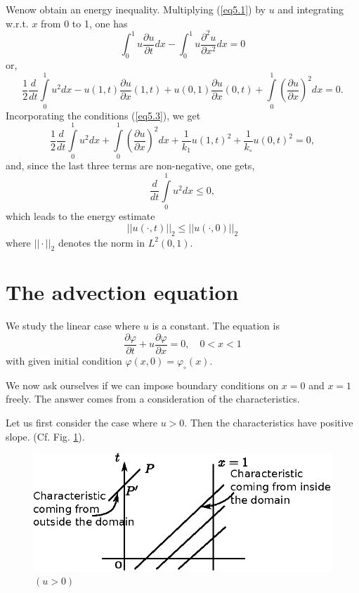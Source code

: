 We\pageoriginale now obtain an energy inequality. Multiplying (\ref{eq5.1}) by
$u$ and integrating w.r.t. $x$ from 0 to 1, one has 
$$
\int^1_0 u \frac{\partial u}{\partial t} dx - \int^1_0 u
\frac{\partial^2 u}{\partial x^2} dx = 0
$$
or, 
$$
\frac{1}{2} \frac{d}{dt} \int\limits^1_0 u^2 dx - u (1,t)
\frac{\partial u}{\partial x} (1,t) + u(0,1) \frac{\partial
  u}{\partial x} (0,t) + \int\limits^1_0 (\frac{\partial u}{\partial
  x})^2 dx = 0.
$$
Incorporating the conditions (\ref{eq5.3}), we get 
$$
\frac{1}{2} \frac{d}{dt} \int\limits^1_0 u^2 dx + \int\limits^1_0
\left(\frac{\partial u}{\partial x}\right)^2 dx + \frac{1}{k_1} u(1,t)^2 +
\frac{1}{k_\circ} u(0,t)^2 = 0,
$$
and, since the last three terms are non-negative, one gets,
$$
\frac{d}{dt} \int\limits^1_0 u^2 dx \leq 0,
$$
which leads to the energy estimate
\begin{equation*}
||u(\cdot, t) ||_2 \leq ||u(\cdot, 0)||_2 
\tag{5.4}\label{eq5.4}
\end{equation*}
where $||\cdot||_2$ denotes the norm in $L^2 (0,1)$. 

\section{The advection equation}\label{chap5:sec5.3}

We study the linear case where $u$ is a constant. The equation is
\begin{equation*}
\frac{\partial \varphi}{\partial t} + u \frac{\partial
  \varphi}{\partial x} = 0, \quad 0 < x <1
\tag{5.5}\label{eq5.5}
\end{equation*}
with given initial condition $\varphi (x,0) = \varphi_\circ (x)$.

We now ask ourselves if we can impose boundary conditions on $x=0$ and
$x=1$ freely. The answer comes from a consideration of the
characteristics.

Let us first consider the case where $u>0$. Then the characteristics
have positive slope. (Cf. Fig. \ref{c5:fig5.1}).

\begin{figure}[H]
\centering
\includegraphics{figures/fig52-5.1.eps}
\caption{$(u > 0)$}\label{c5:fig5.1}
\end{figure}\pageoriginale

